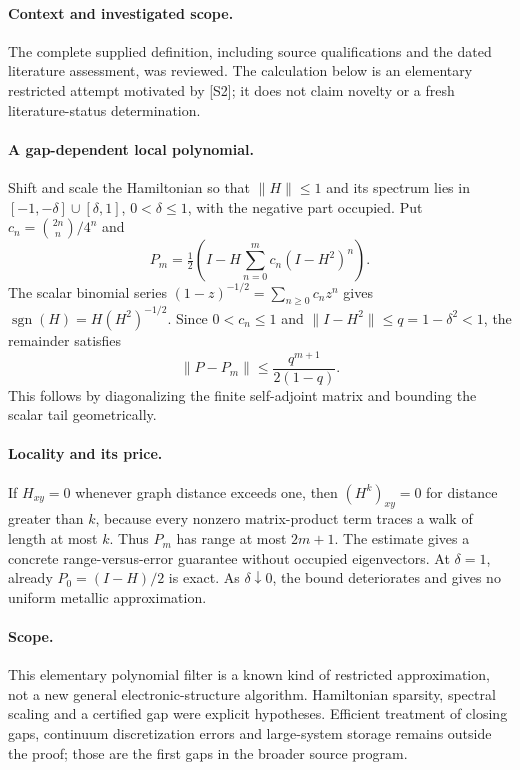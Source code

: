 \documentclass[11pt]{article}
\begin{document}
\paragraph{Context and investigated scope.} The complete supplied definition, including source qualifications and the dated literature assessment, was reviewed. The calculation below is an elementary restricted attempt motivated by [S2]; it does not claim novelty or a fresh literature-status determination.

\paragraph{A gap-dependent local polynomial.} Shift and scale the Hamiltonian so that $\|H\|\leq1$ and its spectrum lies in $[-1,-\delta]\cup[\delta,1]$, $0<\delta\leq1$, with the negative part occupied. Put $c_n=\binom{2n}{n}/4^n$ and
\[
 P_m=\tfrac12\left(I-H\sum_{n=0}^m c_n(I-H^2)^n\right).
\]
The scalar binomial series $(1-z)^{-1/2}=\sum_{n\geq0}c_nz^n$ gives $\operatorname{sgn}(H)=H(H^2)^{-1/2}$. Since $0<c_n\leq1$ and $\|I-H^2\|\leq q=1-\delta^2<1$, the remainder satisfies
\[
 \|P-P_m\|\leq\frac{q^{m+1}}{2(1-q)}.
\]
This follows by diagonalizing the finite self-adjoint matrix and bounding the scalar tail geometrically.

\paragraph{Locality and its price.} If $H_{xy}=0$ whenever graph distance exceeds one, then $(H^k)_{xy}=0$ for distance greater than $k$, because every nonzero matrix-product term traces a walk of length at most $k$. Thus $P_m$ has range at most $2m+1$. The estimate gives a concrete range-versus-error guarantee without occupied eigenvectors. At $\delta=1$, already $P_0=(I-H)/2$ is exact. As $\delta\downarrow0$, the bound deteriorates and gives no uniform metallic approximation.

\paragraph{Scope.} This elementary polynomial filter is a known kind of restricted approximation, not a new general electronic-structure algorithm. Hamiltonian sparsity, spectral scaling and a certified gap were explicit hypotheses. Efficient treatment of closing gaps, continuum discretization errors and large-system storage remains outside the proof; those are the first gaps in the broader source program.
\end{document}
